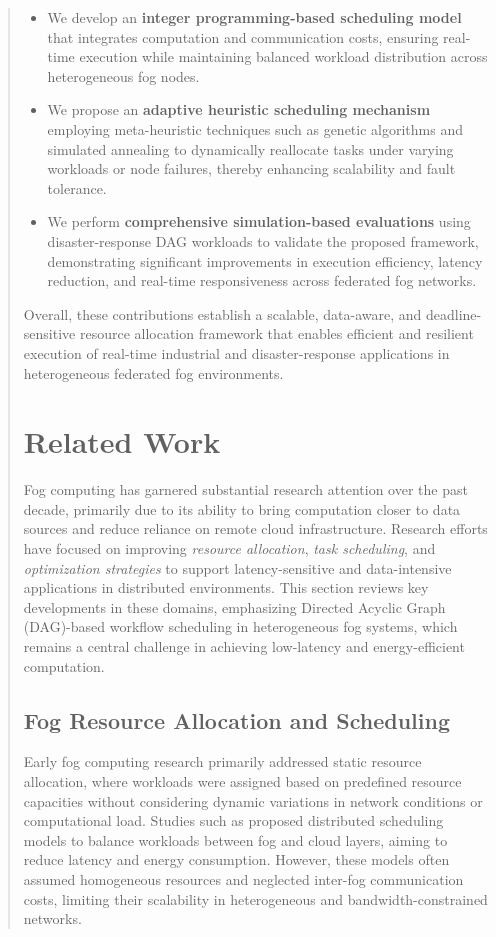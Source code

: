 \documentclass[conference]{IEEEtran}
\begin{document}
\begin{abstract}
\begin{itemize}
    \item We develop an \textbf{integer programming-based scheduling model} that integrates computation and communication costs, ensuring real-time execution while maintaining balanced workload distribution across heterogeneous fog nodes.
    
    \item We propose an \textbf{adaptive heuristic scheduling mechanism} employing meta-heuristic techniques such as genetic algorithms and simulated annealing to dynamically reallocate tasks under varying workloads or node failures, thereby enhancing scalability and fault tolerance.
    
    \item We perform \textbf{comprehensive simulation-based evaluations} using disaster-response DAG workloads to validate the proposed framework, demonstrating significant improvements in execution efficiency, latency reduction, and real-time responsiveness across federated fog networks.
\end{itemize}

Overall, these contributions establish a scalable, data-aware, and deadline-sensitive resource allocation framework that enables efficient and resilient execution of real-time industrial and disaster-response applications in heterogeneous federated fog environments.


\section{Related Work}

Fog computing has garnered substantial research attention over the past decade, primarily due to its ability to bring computation closer to data sources and reduce reliance on remote cloud infrastructure. Research efforts have focused on improving \textit{resource allocation}, \textit{task scheduling}, and \textit{optimization strategies} to support latency-sensitive and data-intensive applications in distributed environments. This section reviews key developments in these domains, emphasizing Directed Acyclic Graph (DAG)-based workflow scheduling in heterogeneous fog systems, which remains a central challenge in achieving low-latency and energy-efficient computation.

\subsection{Fog Resource Allocation and Scheduling}
Early fog computing research primarily addressed static resource allocation, where workloads were assigned based on predefined resource capacities without considering dynamic variations in network conditions or computational load. Studies such as \cite{chiou2022emergency, mattia2023fogcontrol} proposed distributed scheduling models to balance workloads between fog and cloud layers, aiming to reduce latency and energy consumption. However, these models often assumed homogeneous resources and neglected inter-fog communication costs, limiting their scalability in heterogeneous and bandwidth-constrained networks.


\end{abstract}
\end{document}

